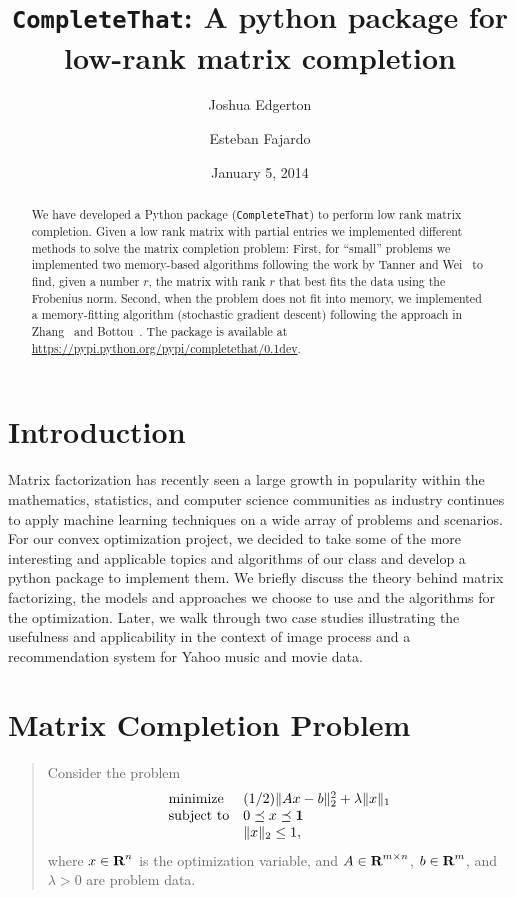\documentclass[12pt]{article}
\title{\texttt{CompleteThat}: A python package for  low-rank matrix completion}
\author{Joshua Edgerton \and Esteban Fajardo}
\date{January 5, 2014}
\begin{document}
\maketitle

\begin{abstract}
We have developed a Python package (\texttt{CompleteThat}) to perform low rank matrix completion. Given a low rank matrix with partial entries we implemented different methods to solve the matrix completion problem:  First, for ``small'' problems we implemented two memory-based algorithms  following the work by Tanner and Wei~\cite{Tanner:2014} to find, given a number $r$, the matrix with rank $r$ that best fits the data using the Frobenius norm. Second, when the problem does not fit into memory, we implemented a memory-fitting algorithm (stochastic gradient descent) following the approach in Zhang~\cite{zhang:2004} and Bottou~\cite{bottou:2012}. The package is available at \url{https://pypi.python.org/pypi/completethat/0.1dev}. 
\end{abstract}

\newpage
\tableofcontents
\newpage

\section{Introduction}
Matrix factorization has recently seen a large growth in popularity within the mathematics, statistics, and computer science communities as industry continues to apply machine learning techniques on a wide array of problems and scenarios. For our convex optimization project, we decided to take some of the more interesting and applicable topics and algorithms of our class and develop a python package to implement them. We briefly discuss the theory behind matrix factorizing, the models and approaches we choose to use and the algorithms for the optimization. Later, we walk through two case studies illustrating the usefulness and applicability in the context of image process and a recommendation system for Yahoo music and movie data. 

\section{Matrix Completion Problem}

\begin{quote}
Consider the problem
    \begin{equation}
    \begin{array}{ll}
    \mbox{minimize}   & (1/2)\|Ax-b\|_2^2 + \lambda \|x\|_1 \\
    \mbox{subject to} & 0 \preceq x \preceq \mathbf 1 \\
    & \|x\|_2 \leq 1,
    \end{array}
    \label{eq:original_problem}
    \end{equation}
where $x \in {\mbox{\bf R}}^n$ is the optimization variable, and $A \in {\mbox{\bf R}}^{m
\times n}$, $b \in {\mbox{\bf R}}^m$, and $\lambda > 0$ are problem data.
\end{quote}
\end{document}

